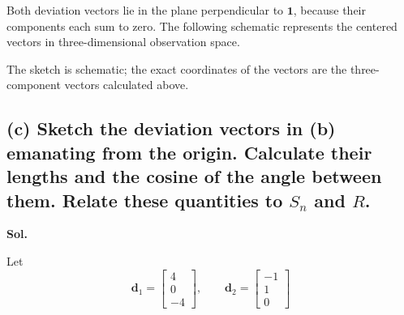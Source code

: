\documentclass[12pt]{article}
\begin{document}
\vspace{0.2cm}

Both deviation vectors lie in the plane perpendicular to $\boldsymbol{1}$, because their components each sum to zero. The following schematic represents the centered vectors in three-dimensional observation space.

\vspace{0.2cm}

\begin{center}
\end{center}

\vspace{0.2cm}

The sketch is schematic; the exact coordinates of the vectors are the three-component vectors calculated above.

\vspace{0.2cm}

\subsection*{(c) Sketch the deviation vectors in (b) emanating from the origin. Calculate their lengths and the cosine of the angle between them. Relate these quantities to $S_n$ and $R$.}

\vspace{0.2cm}

\textbf{Sol.}

\vspace{0.2cm}

Let
\[
\boldsymbol{d}_1=\begin{bmatrix}4\\0\\-4\end{bmatrix},
\qquad
\boldsymbol{d}_2=\begin{bmatrix}-1\\1\\0\end{bmatrix}
\]
\end{document}
